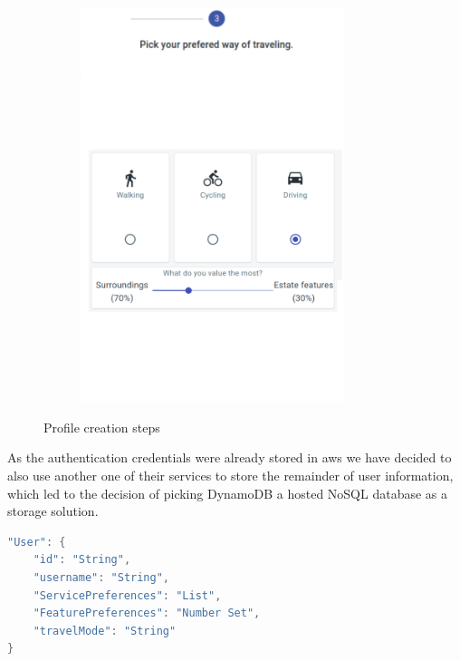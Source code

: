\begin{figure}[h]
\begin{subfigure}[b]{0.3\textwidth}
        \includegraphics[width=0.85\textwidth]{Chapters/img/backend/ui_stepper_3.png}
        \caption{\centering}
        \label{fig:ui-stepper-3}
    \end{subfigure}
    \caption{Profile creation steps}
    \label{fig:profile-stepper}
\end{figure}

As the authentication credentials were already stored in \acrshort{aws} we have decided to also use another one of their services to store the remainder of user information, which led to the decision of picking DynamoDB a hosted NoSQL database as a storage solution.

\begin{lstlisting}[float, language=Java, caption={[User data model for DynamoDB]{Data model of the User in DynamoDB}}, captionpos=t]
"User": {
    "id": "String",
    "username": "String",
    "ServicePreferences": "List",
    "FeaturePreferences": "Number Set",
    "travelMode": "String"
}
\end{lstlisting}

